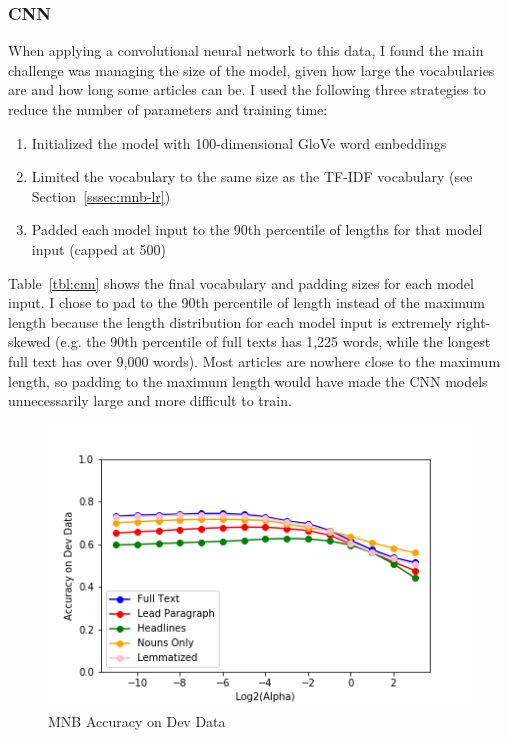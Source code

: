 \documentclass[11pt,a4paper,table]{article}
\begin{document}
\subsubsection{CNN}
\label{sssec:cnn}

When applying a convolutional neural network to this data, I found the main challenge was managing the size of the model, given how large the vocabularies are and how long some articles can be. I used the following three strategies to reduce the number of parameters and training time:

\begin{enumerate}
\item Initialized the model with 100-dimensional GloVe word embeddings \cite{GloVe}
\item Limited the vocabulary to the same size as the TF-IDF vocabulary (see Section~\ref{sssec:mnb-lr})
\item Padded each model input to the 90th percentile of lengths for that model input (capped at 500)
\end{enumerate}

Table~\ref{tbl:cnn} shows the final vocabulary and padding sizes for each model input. I chose to pad to the 90th percentile of length instead of the maximum length because the length distribution for each model input is extremely right-skewed (e.g. the 90th percentile of full texts has 1,225 words, while the longest full text has over 9,000 words). Most articles are nowhere close to the maximum length, so padding to the maximum length would have made the CNN models unnecessarily large and more difficult to train.

\begin{figure}
\centering
\includegraphics[scale=0.57]{mnb_accuracy}
\caption{MNB Accuracy on Dev Data}
\label{fig:mnb-acc}
\end{figure}
\end{document}

